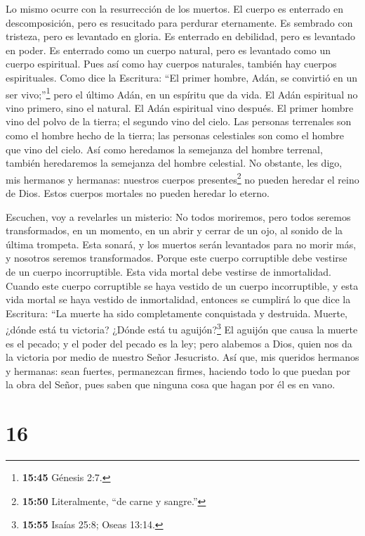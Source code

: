  Lo mismo ocurre con la resurrección de los muertos. El
cuerpo es enterrado en descomposición, pero es resucitado para perdurar
eternamente.  Es sembrado con tristeza, pero es levantado
en gloria. Es enterrado en debilidad, pero es levantado en poder.
 Es enterrado como un cuerpo natural, pero es levantado
como un cuerpo espiritual. Pues así como hay cuerpos naturales, también
hay cuerpos espirituales.  Como dice la Escritura: ``El
primer hombre, Adán, se convirtió en un ser vivo;''\footnote{\textbf{15:45}
  Génesis 2:7.} pero el último Adán, en un espíritu que da vida.
 El Adán espiritual no vino primero, sino el natural. El
Adán espiritual vino después.  El primer hombre vino del
polvo de la tierra; el segundo vino del cielo.  Las
personas terrenales son como el hombre hecho de la tierra; las personas
celestiales son como el hombre que vino del cielo.  Así
como heredamos la semejanza del hombre terrenal, también heredaremos la
semejanza del hombre celestial.  No obstante, les digo, mis
hermanos y hermanas: nuestros cuerpos presentes\footnote{\textbf{15:50}
  Literalmente, ``de carne y sangre.''} no pueden heredar el reino de
Dios. Estos cuerpos mortales no pueden heredar lo eterno.

 Escuchen, voy a revelarles un misterio: No todos
moriremos, pero todos seremos transformados,  en un
momento, en un abrir y cerrar de un ojo, al sonido de la última
trompeta. Esta sonará, y los muertos serán levantados para no morir más,
y nosotros seremos transformados.  Porque este cuerpo
corruptible debe vestirse de un cuerpo incorruptible. Esta vida mortal
debe vestirse de inmortalidad.  Cuando este cuerpo
corruptible se haya vestido de un cuerpo incorruptible, y esta vida
mortal se haya vestido de inmortalidad, entonces se cumplirá lo que dice
la Escritura: ``La muerte ha sido completamente conquistada y destruida.
 Muerte, ¿dónde está tu victoria? ¿Dónde está tu
aguijón?\footnote{\textbf{15:55} Isaías 25:8; Oseas 13:14.}
 El aguijón que causa la muerte es el pecado; y el poder
del pecado es la ley;  pero alabemos a Dios, quien nos da
la victoria por medio de nuestro Señor Jesucristo.  Así
que, mis queridos hermanos y hermanas: sean fuertes, permanezcan firmes,
haciendo todo lo que puedan por la obra del Señor, pues saben que
ninguna cosa que hagan por él es en vano.

\hypertarget{section-15}{%
\section{16}\label{section-15}}

